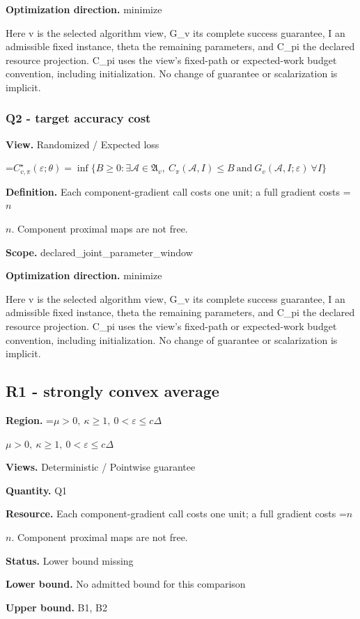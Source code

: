 \documentclass[10pt,a4paper]{article}
\newcommand{\AtlasMath}[1]{\par\begingroup\centering\setbox0=\hbox{$\displaystyle #1$}\ifdim\wd0>1.4\linewidth\typeout{ATLAS WIDE FORMULA: \the\wd0}\fi\ifdim\wd0>\linewidth\resizebox{\linewidth}{!}{\box0}\else\box0\fi\par\endgroup}
\newcommand{\AtlasInlineMath}[1]{\begingroup\setbox0=\hbox{$#1$}\ifdim\wd0>.4\linewidth\endgroup\AtlasMath{#1}\else\endgroup$#1$\fi}
\begin{document}
\textbf{Optimization direction.} minimize

Here v is the selected algorithm view, G\_v its complete success guarantee, I an admissible fixed instance, theta the remaining parameters, and C\_pi the declared resource projection. C\_pi uses the view's fixed-path or expected-work budget convention, including initialization. No change of guarantee or scalarization is implicit.

\subsubsection{Q2 - target accuracy cost}
\textbf{View.} Randomized / Expected loss

\AtlasMath{C^\star_{v,\pi}(\varepsilon;\theta)=\inf\{B\ge0:\exists\mathcal A\in\mathfrak A_v,\ C_\pi(\mathcal A,I)\le B\ \text{and}\ G_v(\mathcal A,I;\varepsilon)\ \forall I\}}
\textbf{Definition.} Each component-gradient call costs one unit; a full gradient costs \AtlasInlineMath{n}. Component proximal maps are not free.

\textbf{Scope.} declared\_joint\_parameter\_window

\textbf{Optimization direction.} minimize

Here v is the selected algorithm view, G\_v its complete success guarantee, I an admissible fixed instance, theta the remaining parameters, and C\_pi the declared resource projection. C\_pi uses the view's fixed-path or expected-work budget convention, including initialization. No change of guarantee or scalarization is implicit.

\subsection{R1 - strongly convex average}
\textbf{Region.} \AtlasInlineMath{\mu>0,\ \kappa\ge1,\ 0<\varepsilon\le c\Delta}

\textbf{Views.} Deterministic / Pointwise guarantee

\textbf{Quantity.} Q1

\textbf{Resource.} Each component-gradient call costs one unit; a full gradient costs \AtlasInlineMath{n}. Component proximal maps are not free.

\textbf{Status.} Lower bound missing

\textbf{Lower bound.} No admitted bound for this comparison

\textbf{Upper bound.} B1, B2
\end{document}
